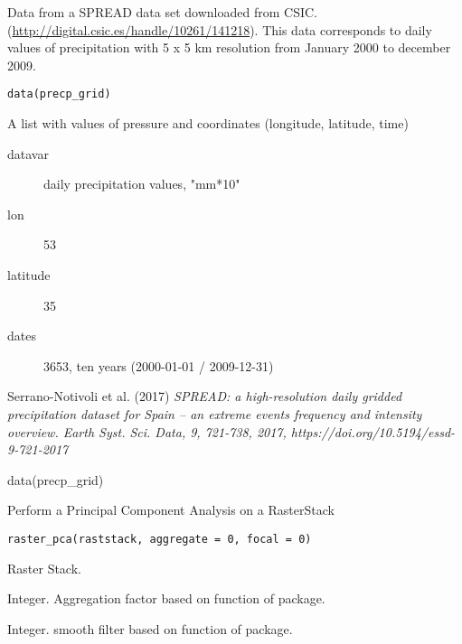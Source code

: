 \documentclass[a4paper]{book}
\begin{document}
%
\begin{Description}\relax
Data from a SPREAD data set downloaded from CSIC.
(\url{http://digital.csic.es/handle/10261/141218}).
This data corresponds to daily values of precipitation with 5 x 5 km resolution from January 2000 to december 2009.
\end{Description}
%
\begin{Usage}
\begin{verbatim}
data(precp_grid)
\end{verbatim}
\end{Usage}
%
\begin{Format}
A list with values of pressure and coordinates (longitude, latitude, time)
\begin{description}

\item[datavar] daily precipitation values, "mm*10"
\item[lon] 53
\item[latitude] 35
\item[dates] 3653, ten years (2000-01-01 / 2009-12-31)

\end{description}
\end{Format}
%
\begin{References}\relax
Serrano-Notivoli et al. (2017)
\emph{SPREAD: a high-resolution daily gridded precipitation dataset for Spain – an extreme events frequency and intensity overview.
Earth Syst. Sci. Data, 9, 721-738, 2017, https://doi.org/10.5194/essd-9-721-2017}
\end{References}
%
\begin{Examples}
\begin{ExampleCode}
data(precp_grid)
\end{ExampleCode}
\end{Examples}
%
\begin{Description}\relax
Perform a Principal Component Analysis on a RasterStack
\end{Description}
%
\begin{Usage}
\begin{verbatim}
raster_pca(raststack, aggregate = 0, focal = 0)
\end{verbatim}
\end{Usage}
%
\begin{Arguments}
\begin{ldescription}
\item[\code{raststack}] Raster Stack.

\item[\code{aggregate}] Integer. Aggregation factor based on function  of  package.

\item[\code{focal}] Integer. smooth filter based on function  of  package.
\end{ldescription}
\end{Arguments}
\end{document}
